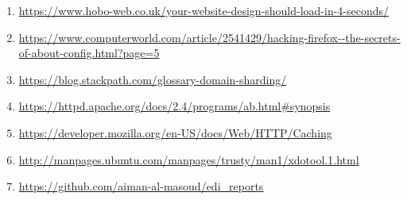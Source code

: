 \documentclass[a4paper,10pt]{article}
\begin{document}
\begin{enumerate}

\item \label{article1} \url{https://www.hobo-web.co.uk/your-website-design-should-load-in-4-seconds/} 

\item \label{article2} \url{https://www.computerworld.com/article/2541429/hacking-firefox--the-secrets-of-about-config.html?page=5} 

\item \label{article3} \url{https://blog.stackpath.com/glossary-domain-sharding/} 


\item \label{article4} \url{https://httpd.apache.org/docs/2.4/programs/ab.html#synopsis} 

\item \label{article5} \url{https://developer.mozilla.org/en-US/docs/Web/HTTP/Caching} 


\item \label{article6} \url{http://manpages.ubuntu.com/manpages/trusty/man1/xdotool.1.html} 


\item \label{article7} \url{https://github.com/aiman-al-masoud/edi_reports} 



\end{enumerate}
\end{document}
